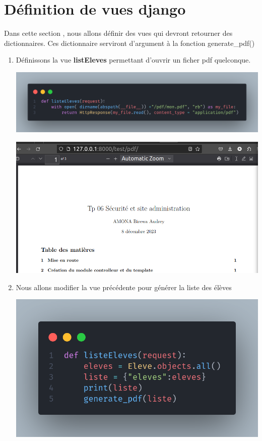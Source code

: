 \documentclass[11pt,a4paper]{article}
\begin{document}
\section{Définition de vues django}
Dans cette section , nous allons définir des vues qui devront retourner des dictionnaires. Ces dictionnaire serviront d'argument à la fonction generate\_pdf()
\begin{enumerate}
	\item Définissons la vue \textbf{listEleves} permettant d'ouvrir un ficher pdf quelconque.
		\begin{center}
		\includegraphics[scale=0.3]{images/test.png}
	\end{center}
			\begin{center}
		\includegraphics[scale=0.3]{images/pdf.png}
	\end{center}
	\item Nous allons modifier la vue précédente pour générer la liste des élèves
	\begin{center}
		\includegraphics[scale=0.5]{images/gen.png}

\end{center}
\end{enumerate}
\end{document}
